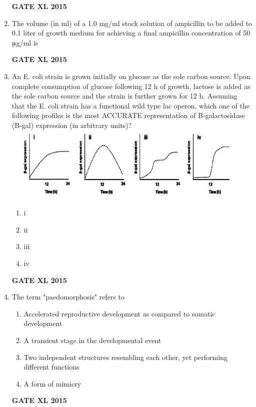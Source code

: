 \documentclass[journal,12pt,onecolumn]{IEEEtran}
\begin{document}
\begin{enumerate}
\begin{flushright}\textbf{GATE XL 2015}\end{flushright}
\item  The volume (in ml) of a 1.0 mg/ml stock solution of ampicillin to be added to 0.1 liter of growth medium for achieving a final ampicillin concentration of 50 $\micro$g/ml is
\begin{flushright}\textbf{GATE XL 2015}\end{flushright}
\item An E. coli strain is grown initially on glucose as the sole carbon source. Upon complete consumption of glucose following 12 h of growth, lactose is added as the sole carbon source and the strain is further grown for 12 h. Assuming that the E. coli strain has a functional wild type lac operon, which one of the following profiles is the most ACCURATE representation of B-galactosidase (B-gal) expression (in arbitrary units)?
	\includegraphics[width=15cm]{85}
    \begin{enumerate}
            \item i
	    \item ii
	    \item iii
            \item iv
    \end{enumerate}
\begin{flushright}\textbf{GATE XL 2015}\end{flushright}
\item  The term "paedomorphosis" refers to
    \begin{enumerate}
            \item Accelerated reproductive development as compared to somatic development
	    \item A transient stage in the developmental event
	    \item  Two independent structures resembling each other, yet performing different functions
            \item A form of mimicry
    \end{enumerate}
\begin{flushright}\textbf{GATE XL 2015}\end{flushright}

\end{enumerate}
\end{document}
